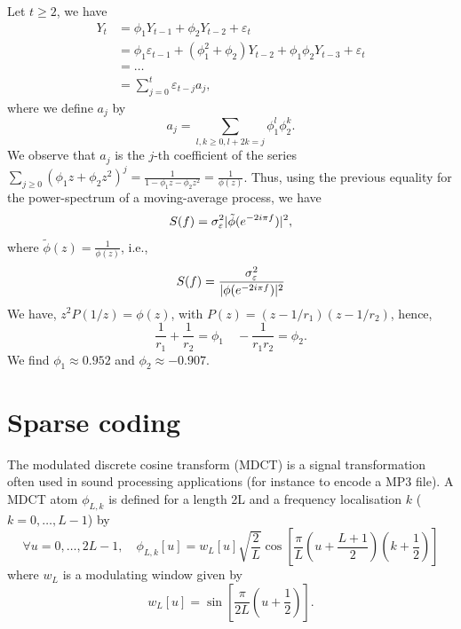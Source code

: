 \documentclass[11pt]{article}
\DeclarePairedDelimiter\abs{|}{|}
\begin{document}
\begin{solution}
Let $t\geq 2$, we have
%
\begin{equation}
    \begin{split}
        Y_t &= \phi_1 Y_{t-1} + \phi_2 Y_{t-2} + \varepsilon_t\\
        &= \phi_1 \varepsilon_{t-1} + (\phi_1^2+\phi_2)Y_{t-2} + \phi_1\phi_2 Y_{t-3} + \varepsilon_{t}\\
        &= \ldots\\
        &= \sum_{j=0}^{t} \varepsilon_{t-j} a_j,
    \end{split}
\end{equation}
%
where we define $a_j$ by
%
\begin{equation}
    a_j = \sum_{l,k\geq 0, l+2k=j}\phi_1^{l}\phi_2^{k}.
\end{equation}
%
We observe that $a_j$ is the $j$-th coefficient of the series $\sum_{j\geq 0} (\phi_1z +\phi_2z^2)^{j}=\frac{1}{1-\phi_1 z -\phi_2 z^2}= \frac{1}{\phi(z)}$.
Thus, using the previous equality for the power-spectrum of a moving-average process, we have
%
\begin{equation}
    S(f) = \sigma_{\varepsilon}^2 \abs{\tilde{\phi}(e^{-2i\pi f})}^2,
\end{equation}
%
where $\tilde{\phi}(z) = \frac{1}{\phi(z)}$, i.e.,
%
\begin{equation}
    S(f) = \frac{\sigma_{\varepsilon}^2}{\abs{\phi(e^{-2i\pi f})}^2}
\end{equation}
%
We have, $z^2P(1/z) = \phi(z)$, with $P(z) = (z-1/r_1)(z-1/r_2)$, hence,
%
\begin{equation}
    \frac{1}{r_1} + \frac{1}{r_2} = \phi_1 \quad -\frac{1}{r_1 r_2} = \phi_2.
\end{equation}
%
We find $\phi_1\approx 0.952$ and $\phi_2 \approx -0.907$.
\end{solution}

\newpage
\section{Sparse coding}

The modulated discrete cosine transform (MDCT) is a signal transformation often used in sound processing applications (for instance to encode a MP3 file).
A MDCT atom $\phi_{L,k}$ is defined for a length 2L and a frequency localisation $k$ ($k=0,\dots,L-1$) by
\begin{equation}
\forall u=0,\dots,2L-1,\quad\phi_{L,k}[u]=w_{L}[u]\sqrt{\frac{2}{L}} \cos [ \frac{\pi}{L} \left(u+ \frac{L+1}{2}\right) (k+\frac{1}{2}) ]
\label{equa_atom}
\end{equation}
where $w_{L}$ is a modulating window given by
\begin{equation}
w_L[u] = \sin \left[{\frac {\pi }{2L}}\left(u+{\frac {1}{2}}\right)\right].
\end{equation}
\end{document}
